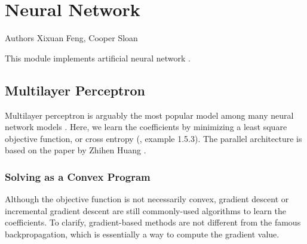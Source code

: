 



\chapter{Neural Network}

\begin{moduleinfo}
\item[Authors] {Xixuan Feng, Cooper Sloan}
\end{moduleinfo}

This module implements artificial neural network \cite{ann_wiki}.

\section{Multilayer Perceptron}
Multilayer perceptron is arguably the most popular model among many neural network models \cite{mlp_wiki}.
Here, we learn the coefficients by minimizing a least square objective function, or cross entropy (\cite{bertsekas1999nonlinear}, example 1.5.3).
The parallel architecture is based on the paper by Zhihen Huang \cite{mlp_parallel}.

\subsection{Solving as a Convex Program}
Although the objective function is not necessarily convex, gradient descent or incremental gradient descent are still commonly-used algorithms to learn the coefficients.
To clarify, gradient-based methods are not different from the famous backpropagation, which is essentially a way to compute the gradient value.

